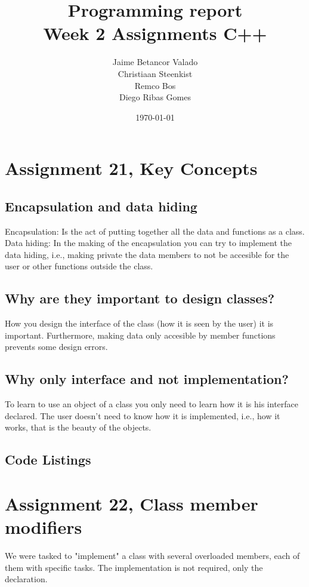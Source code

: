 \documentclass[11pt]{article}
\begin{document}
\title{Programming report \\
       Week 2 Assignments C++
}
\date{\today}
\author{Jaime Betancor Valado \\
Christiaan Steenkist \\
Remco Bos \\
Diego Ribas Gomes
}

\maketitle

\section*{Assignment 21, Key Concepts}

\subsection*{Encapsulation and data hiding}
Encapsulation: Is the act of putting together all the data and functions as a class.
Data hiding: In the making of the encapsulation you can try to implement the data hiding, i.e., making private the data members to not be accesible for the user or other functions outside the class.
\subsection*{Why are they important to design classes?}
How you design the interface of the class (how it is seen by the user) it is important. Furthermore, making data only accesible by member functions prevents some design errors.
\subsection*{Why only interface and not implementation?}
To learn to use an object of a class you only need to learn how it is his interface declared. The user doesn't need to know how it is implemented, i.e., how it works, that is the beauty of the objects.

\subsection*{Code Listings}


\section*{Assignment 22, Class member modifiers}
We were tasked to "implement" a class with several overloaded members, each of them with specific tasks. The implementation is not required, only the declaration.
\end{document}

